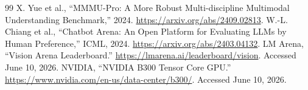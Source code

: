 ﻿\documentclass[11pt,a4paper]{article}
\begin{document}
\begin{thebibliography}{99}
 X. Yue et al., ``MMMU-Pro: A More Robust Multi-discipline Multimodal Understanding Benchmark,'' 2024. \url{https://arxiv.org/abs/2409.02813}.
 W.-L. Chiang et al., ``Chatbot Arena: An Open Platform for Evaluating LLMs by Human Preference,'' ICML, 2024. \url{https://arxiv.org/abs/2403.04132}.
 LM Arena, ``Vision Arena Leaderboard.'' \url{https://lmarena.ai/leaderboard/vision}. Accessed June 10, 2026.
 NVIDIA, ``NVIDIA B300 Tensor Core GPU.'' \url{https://www.nvidia.com/en-us/data-center/b300/}. Accessed June 10, 2026.
\end{thebibliography}

\clearpage
\appendix
\end{document}
